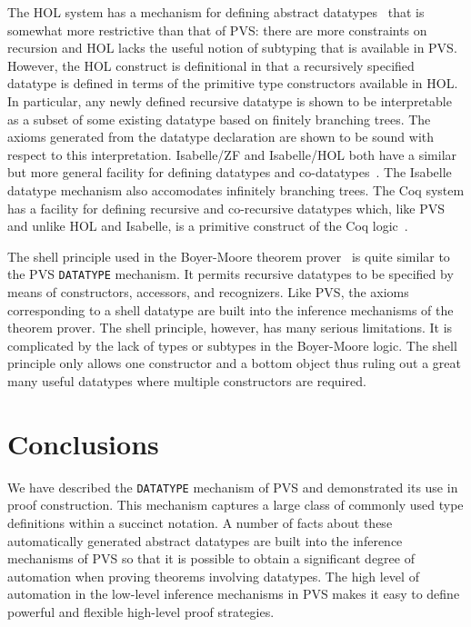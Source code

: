 \documentclass[11pt,twoside]{book}
\begin{document}
The HOL system has a mechanism for defining abstract
datatypes~\cite{Melham89} that is somewhat more restrictive than that of
PVS: there are more constraints on recursion and HOL lacks the useful
notion of subtyping that is available in PVS\@.  However, the HOL
construct is definitional in that a recursively specified datatype is
defined in terms of the primitive type constructors available in HOL.  In
particular, any newly defined recursive datatype is shown to be
interpretable as a subset of some existing datatype based on finitely
branching trees.  The axioms generated from the datatype declaration are
shown to be sound with respect to this interpretation.  Isabelle/ZF and
Isabelle/HOL both have a similar but more general facility for defining
datatypes and co-datatypes~\cite{Paulson97:JLC}.  The Isabelle datatype
mechanism also accomodates infinitely branching trees.  The Coq system has
a facility for defining recursive and co-recursive datatypes which,
like PVS and unlike HOL and Isabelle, is  
a primitive construct of the Coq logic~\cite{Coq:RecTypes}. 

The shell principle used in the Boyer-Moore theorem
prover~\cite{Boyer-Moore79,boyer-moore88} is quite similar to the PVS \texttt{DATATYPE} mechanism.  It permits recursive datatypes to be specified by
means of constructors, accessors, and recognizers.  Like PVS, the axioms
corresponding to a shell datatype are built into the inference mechanisms
of the theorem prover.  The shell principle, however, has many serious
limitations.  It is complicated by the lack of types or subtypes in the
Boyer-Moore logic.  The shell principle only allows one constructor and a
bottom object thus ruling out a great many useful datatypes where multiple
constructors are required.


\chapter{Conclusions}

We have described the \texttt{DATATYPE} mechanism of PVS and demonstrated
its use in proof construction.  This mechanism captures a large class
of commonly used type definitions within a succinct notation.  A
number of facts about these automatically generated abstract datatypes
are built into the inference mechanisms of PVS so that it is possible
to obtain a significant degree of automation when proving theorems
involving datatypes.  The high level of automation in the low-level
inference mechanisms in PVS makes it  easy to define
powerful and flexible high-level proof strategies.  
\end{document}
